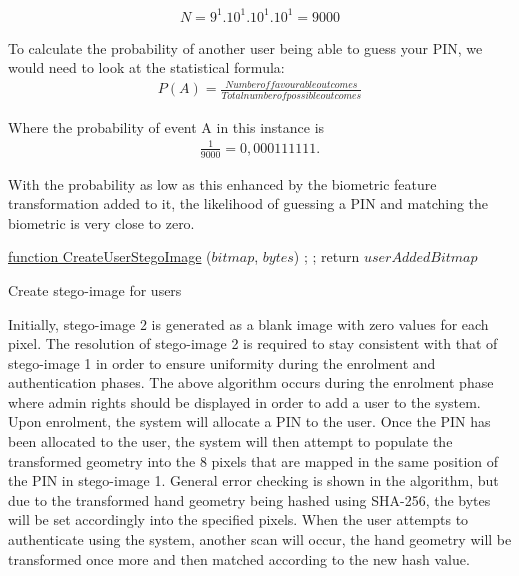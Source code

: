 \begin{gather}
    N = 9^{1}.10^{1}.10^{1}.10^{1} 
    = 9000    
\end{gather}



To calculate the probability of another user being able to guess your PIN, we would need to look at the statistical formula: 
\begin{gather}
    P (A) = \frac{Number of favourable outcomes}{Total number of possible outcomes}
\end{gather}


Where the probability of event A in this instance is 
\begin{gather}
    \frac{1}{9000} = 0,000111111.
\end{gather}

With the probability as low as this enhanced by the biometric feature transformation added to it, the likelihood of guessing a PIN and matching the biometric is very close to zero.


\begin{algorithm}
     \underline{function CreateUserStegoImage} ($bitmap$, $bytes$)\;
     ;
     ;
     return $userAddedBitmap$
     \caption{Create stego-image for users}
\end{algorithm}


Initially, stego-image 2 is generated as a blank image with zero values for each pixel. The resolution of stego-image 2 is required to stay consistent with that of stego-image 1 in order to ensure uniformity during the enrolment and authentication phases. The above algorithm occurs during the enrolment phase where admin rights should be displayed in order to add a user to the system. Upon enrolment, the system will allocate a PIN to the user. Once the PIN has been allocated to the user, the system will then attempt to populate the transformed geometry into the 8 pixels that are mapped in the same position of the PIN in stego-image 1. General error checking is shown in the algorithm, but due to the transformed hand geometry being hashed using SHA-256, the bytes will be set accordingly into the specified pixels. When the user attempts to authenticate using the system, another scan will occur, the hand geometry will be transformed once more and then matched according to the new hash value.

